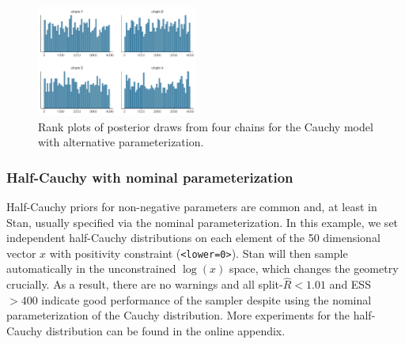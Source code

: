 \documentclass[american,]{article}
\begin{document}
\begin{figure}[tp]
  \centering
  \includegraphics[width=0.47\textwidth]{graphics/hist-fit-alt1-1.pdf}
  \caption{Rank plots of posterior draws from four chains for the Cauchy model with alternative parameterization.}
  \label{fig:hist-fit-alt1-1}
\end{figure}

\hypertarget{half-cauchy-with-nominal-parameterization}{%
\subsubsection*{Half-Cauchy with nominal
parameterization}\label{half-cauchy-with-nominal-parameterization}}

Half-Cauchy priors for non-negative parameters are common and, at least in Stan, 
usually specified via the nominal parameterization.
In this example, we set independent half-Cauchy distributions on each element
of the 50 dimensional vector $x$ with positivity constraint
(\texttt{\textless{}lower=0\textgreater{}}). Stan will then
sample automatically in the unconstrained \(\log(x)\) space, which
changes the geometry crucially. As a result, there are no warnings and all
split-\(\widehat{R}<1.01\) and ESS \(>400\) indicate good
performance of the sampler despite using the nominal parameterization of
the Cauchy distribution. More experiments for the half-Cauchy distribution 
can be found in the online appendix.






\end{document}
